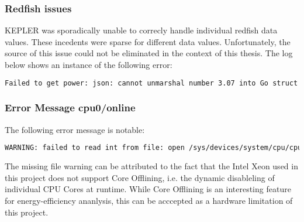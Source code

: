 \subsubsection{Redfish issues}

KEPLER was sporadically unable to correcly handle individual redfish data values. These incedents were sparse for different data values. Unfortunately, the source of this issue could not be eliminated in the context of this thesis. The log below shows an instance of the following error:

\begin{lstlisting}[language=bash]
Failed to get power: json: cannot unmarshal number 3.07 into Go struct field Voltages.Voltages.ReadingVolts of type int
\end{lstlisting}

\subsubsection{Error Message cpu0/online}
The following error message is notable: 
\begin{lstlisting}[language=bash]
WARNING: failed to read int from file: open /sys/devices/system/cpu/cpu0/online: no such file or directory
\end{lstlisting}
The missing file warning can be attributed to the fact that the Intel Xeon used in this project does not support Core Offlining, i.e. the dynamic disableling of individual CPU Cores at runtime. While Core Offlining is an interesting feature for energy-efficiency ananlysis, this can be acccepted as a hardware limitation of this project.